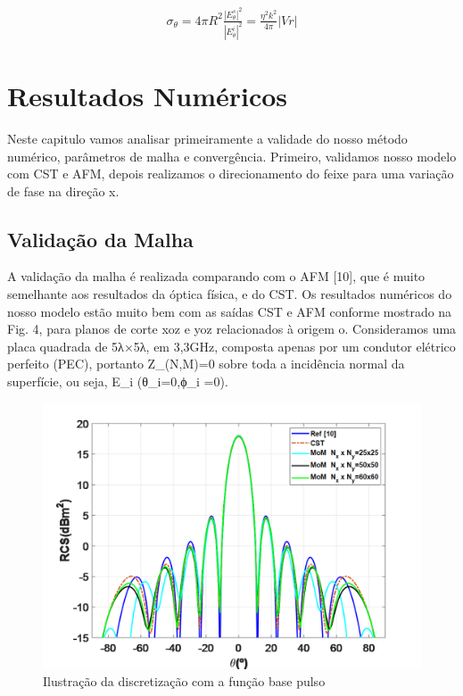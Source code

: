 \documentclass[
	12pt,				%
	openright,			%
	oneside,			%
	a4paper,			%
	english,			%
	brazil				%
	]{abntex2}
\begin{document}
 \begin{equation}
\begin{aligned}
\sigma_{\theta}=4\pi R^2\frac{|E_{\theta}^s|^2}{|E_{\theta}^{i}|^2}=
\frac{\eta^2 k^2}{4 \pi}|Vr|
   \end{aligned}
\end{equation}












\chapter{Resultados Numéricos}
Neste capitulo vamos analisar primeiramente a validade do nosso método numérico, parâmetros de malha e convergência. Primeiro, validamos nosso modelo com CST e AFM, depois realizamos o direcionamento do feixe para uma variação de fase na direção x.


\section{Validação da Malha}
A validação da malha é realizada comparando com o AFM [10], que é muito semelhante aos resultados da óptica física, e do CST. Os resultados numéricos do nosso modelo estão muito bem com as saídas CST e AFM conforme mostrado na Fig. 4, para planos de corte xoz e yoz relacionados à origem o. Consideramos uma placa quadrada de 5λ×5λ, em 3,3GHz, composta apenas por um condutor elétrico perfeito (PEC), portanto Z_(N,M)=0 sobre toda a incidência normal da superfície, ou seja, E_i (θ_i=0,ϕ_i =0).


\begin{figure}[htb]
 \label{DiscretizaçãoXY}
    \centering
    \caption{Ilustração da discretização  com a função base pulso} \label{fig_minipage}
    \includegraphics[width=\textwidth]{figures/RCSMeshValidationXoz.png}
  \hfill
\end{figure}
\end{document}
